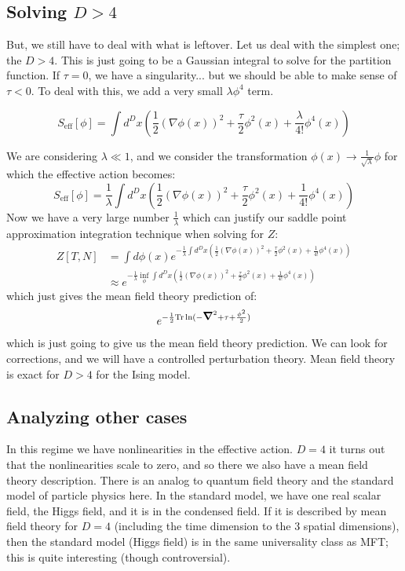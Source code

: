 \subsection{Solving $D > 4$}

But, we still have to deal with what is leftover. Let us deal with the simplest one; the $D > 4$. This is just going to be a Gaussian integral to solve for the partition function. If $\tau = 0$, we have a singularity... but we should be able to make sense of $\tau < 0$. To deal with this, we add a very small $\lambda\phi^4$ term.

\begin{equation}
    S_{\text{eff}}[\phi] = \int d^Dx \left(\frac{1}{2}(\nabla \phi(x))^2 + \frac{\tau}{2}\phi^2(x) + \frac{\lambda}{4!}\phi^4(x)\right)
\end{equation}

We are considering $\lambda \ll 1$, and we consider the transformation $\phi(x) \to \frac{1}{\sqrt{\lambda}}\phi$  for which the effective action becomes:
\begin{equation}
    S_{\text{eff}}[\phi] = \frac{1}{\lambda}\int d^Dx \left(\frac{1}{2}(\nabla \phi(x))^2 + \frac{\tau}{2}\phi^2(x) + \frac{1}{4!}\phi^4(x)\right)
\end{equation}
Now we have a very large number $\frac{1}{\lambda}$ which can justify our saddle point approximation integration technique when solving for $Z$:
\begin{equation}
    \begin{split}
        Z[T, N] &= \int d\phi(x) e^{-\frac{1}{\lambda}\int d^Dx \left(\frac{1}{2}(\nabla \phi(x))^2 + \frac{\tau}{2}\phi^2(x) + \frac{1}{4!}\phi^4(x)\right)} 
        \\ &\approx e^{-\frac{1}{\lambda}\inf_\phi\int d^Dx \left(\frac{1}{2}(\nabla \phi(x))^2 + \frac{\tau}{2}\phi^2(x) + \frac{1}{4!}\phi^4(x)\right)}
    \end{split}
\end{equation}
which just gives the mean field theory prediction of:
\begin{equation}
    e^{-\frac{1}{2}\Tr\ln(-\nabla^2 + \tau + \frac{\phi^2}{2})}
\end{equation}
which is just going to give us the mean field theory prediction. We can look for corrections, and we will have a controlled perturbation theory. Mean field theory is exact for $D > 4$ for the Ising model.

\subsection{Analyzing other cases}
In this regime we have nonlinearities in the effective action. $D = 4$ it turns out that the nonlinearities scale to zero, and so there we also have a mean field theory description. There is an analog to quantum field theory and the standard model of particle physics here. In the standard model, we have one real scalar field, the Higgs field, and it is in the condensed field. If it is described by mean field theory for $D = 4$ (including the time dimension to the 3 spatial dimensions), then the standard model (Higgs field) is in the same universality class as MFT; this is quite interesting (though controversial).


